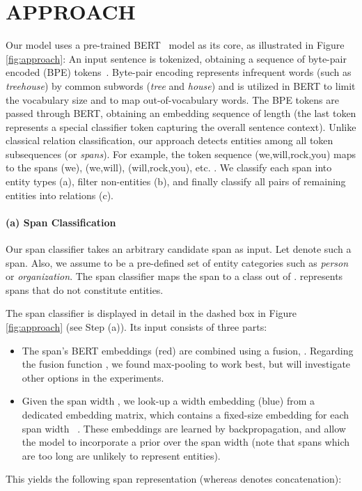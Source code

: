 \documentclass{ecai}
\begin{document}
\section{APPROACH}

Our model uses a pre-trained BERT~\cite{devlin:2018:bert} model as its core, as illustrated in Figure \ref{fig:approach}: 
An input sentence is tokenized, obtaining a sequence of  byte-pair encoded (BPE) tokens~\cite{sennrich:2016:bpe}. Byte-pair encoding represents infrequent words (such as {\it treehouse}) by common subwords ({\it tree} and {\it house}) and is utilized in BERT to limit the vocabulary size and to map out-of-vocabulary words.
The BPE tokens are passed through BERT, obtaining an embedding sequence  of length  (the last token  represents a special classifier token capturing the overall sentence context). Unlike classical relation classification, our approach detects entities among all token subsequences (or {\it spans}). For example, the token sequence (we,will,rock,you) maps to the spans (we), (we,will), (will,rock,you), etc. . 
We classify each span into entity types (a), filter non-entities (b), and finally classify all pairs of remaining entities into relations (c). 

\paragraph{(a) Span Classification} Our span classifier takes an arbitrary candidate span as input. Let  denote such a span.  Also, we assume  to be a pre-defined set of entity categories such as {\it person} or {\it organization}. The span classifier maps the span  to a class out of .  represents spans that do not constitute entities. 

The span classifier is displayed in detail in the dashed box in Figure \ref{fig:approach} (see Step (a)). Its input consists of three parts:
\begin{itemize}
    \item The span's BERT embeddings (red) are combined using a fusion, .
    Regarding the fusion function , we found max-pooling to work best, but will investigate other options in the experiments.
    \item Given the span width , we look-up a width embedding  (blue) from a dedicated embedding matrix, which contains a fixed-size embedding for each span width ~\cite{lee:2017:span_coreference}.
    These embeddings are learned by backpropagation, and allow the model to incorporate a prior over the span width (note that spans which are too long are unlikely to represent entities).
\end{itemize}
This yields the following span representation (whereas  denotes concatenation):
    
\end{document}
